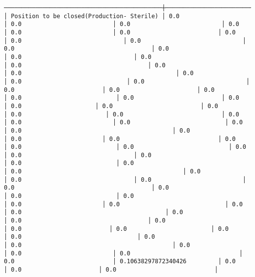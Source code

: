 \documentclass[11pt]{article}
\begin{document}
\begin{Verbatim}[commandchars=\\\{\}]
─────────────────────────────────────────────┼───────────────────────────────────────────┼──────────────────────────────────────┼────────────────────────────────────┼─────────────────────────────────────────────────────┼───────────────────────────────────────────┼───────────────────────────────────────────┼────────────────────────────────────┼────────────────────────┼───────────────────────────────────────┼──────────────────────────────────────┼────────────────────────────────────┼────────────────────────────────────────┼────────────────────────────────┼──────────────────────────┼─────────────────────────────┤
│ Position to be closed(Production- Sterile) │ 0.0                                      │ 0.0                          │ 0.0                          │ 0.0                          │ 0.0                          │ 0.0                         │ 0.0                         │ 0.0                             │ 0.0                             │ 0.0                                       │ 0.0                                  │ 0.0                                │ 0.0                                         │ 0.0                                    │ 0.0                                    │ 0.0                                            │ 0.0                             │ 0.0                              │ 0.0                             │ 0.0                         │ 0.0                      │ 0.0                                │ 0.0                           │ 0.0                         │ 0.0                      │ 0.0                     │ 0.0                         │ 0.0                                  │ 0.0                        │ 0.0                            │ 0.0                           │ 0.0                          │ 0.0                           │ 0.0                                            │ 0.0                                           │ 0.0                      │ 0.0                       │ 0.0                            │ 0.0                                │ 0.0                           │ 0.0                           │ 0.0                          │ 0.0                                │ 0.0                            │ 0.0                           │ 0.0                                         │ 0.0                                              │ 0.0                           │ 0.0                                │ 0.0                          │ 0.0                                       │ 0.0                          │ 0.0                           │ 0.0                                     │ 0.0                       │ 0.0                              │ 0.0                                     │ 0.0                                         │ 0.0                                         │ 0.0                                    │ 0.0                                │ 0.0                         │ 0.0                        │ 0.0                              │ 0.0                                 │ 0.0                            │ 0.0                                           │ 0.0                            │ 0.0                          │ 0.0                               │ 0.0                            │ 0.10638297872340426         │ 0.0                     │ 0.0                      │ 0.0                            │ 
\end{Verbatim}
\end{document}
